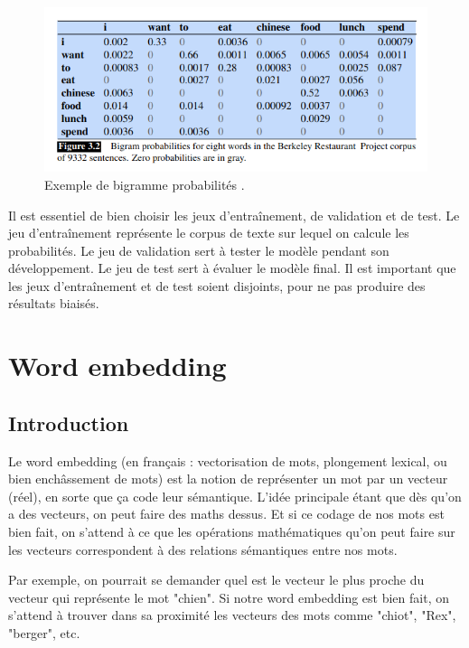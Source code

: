 \documentclass[11pt, a4paper]{report}
\begin{document}
  \begin{figure}[t]
    \centering
    \includegraphics[width=1\textwidth]{bigram.png}
    \caption{Exemple de bigramme probabilités \cite[\textit{Speech and Language Processing}]{stanford-book-ngrams}.}
    \label{fig:pierce}
  \end{figure}

  Il est essentiel de bien choisir les jeux d'entraînement, de validation et de test. 
  Le jeu d'entraînement représente le corpus de texte sur lequel on calcule les 
  probabilités. Le jeu de validation sert à tester le modèle pendant son développement. 
  Le jeu de test sert à évaluer le modèle final. Il est important que les jeux 
  d'entraînement et de test soient disjoints, pour ne pas produire des résultats biaisés. 

\chapter{Word embedding}
  \section{Introduction}
  \cite{wikipedia-wembedding} \cite{wikipedia-wembedding-fr} Le word embedding (en français : vectorisation de mots, plongement lexical, ou bien enchâssement de mots)
est la notion de représenter un mot par un vecteur (réel), en sorte que ça code leur sémantique.
L'idée principale étant que dès qu'on a des vecteurs, on peut faire des maths dessus. Et si ce 
codage de nos mots est bien fait, on s'attend à ce que les opérations mathématiques qu'on peut 
faire sur les vecteurs correspondent à des relations sémantiques entre nos mots. 

Par exemple, on pourrait se demander quel est le vecteur le plus proche du vecteur qui représente 
le mot "chien". Si notre word embedding est bien fait, on s'attend à trouver dans sa proximité 
les vecteurs des mots comme "chiot", "Rex", "berger", etc. 
\end{document}
